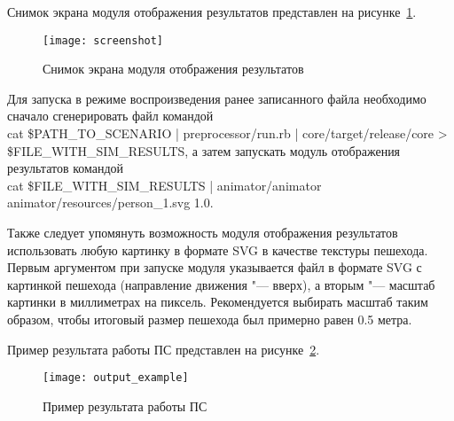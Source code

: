 Снимок экрана модуля отображения результатов представлен на рисунке~\ref{sec:manual:launch:scheenshot}.

\begin{figure}[ht]
  \centering
  \texttt{[image: screenshot]}
  \caption{Снимок экрана модуля отображения результатов}
  \label{sec:manual:launch:scheenshot}
\end{figure}

Для запуска в режиме воспроизведения ранее записанного файла необходимо сначало сгенерировать файл командой \\
cat \$PATH\_TO\_SCENARIO \-|\- preprocessor/run.rb \-|\- core/target/release/core \->\- \\ \$FILE\_WITH\_SIM\_RESULTS,
а затем запускать модуль отображения результатов командой \\
cat \$FILE\_WITH\_SIM\_RESULTS \-|\- animator/animator animator/resources/person\_1.svg 1.0.

Также следует упомянуть возможность модуля отображения результатов использовать любую картинку в формате SVG в качестве текстуры пешехода.
Первым аргументом при запуске модуля указывается файл в формате SVG с картинкой пешехода (направление движения "--- вверх), а вторым "--- масштаб картинки в миллиметрах на пиксель.
Рекомендуется выбирать масштаб таким образом, чтобы итоговый размер пешехода был примерно равен 0.5 метра.

Пример результата работы ПС представлен на рисунке~\ref{sec:manual:launch:result_pic}.

\begin{figure}[ht]
  \texttt{[image: output\_example]}
  \caption{Пример результата работы ПС}
  \label{sec:manual:launch:result_pic}
\end{figure}
